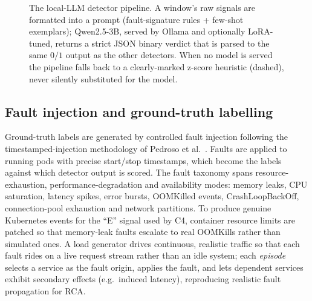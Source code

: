 \documentclass[pdflatex,sn-mathphys-num]{sn-jnl}%
\theoremstyle{thmstyleone}%
\theoremstyle{thmstyletwo}%
\theoremstyle{thmstylethree}%
\begin{document}
\begin{figure}[t]
\centering
{}
\caption{The local-LLM detector pipeline. A window's raw signals are formatted into a
prompt (fault-signature rules {+} few-shot exemplars); Qwen2.5-3B, served by Ollama and
optionally LoRA-tuned, returns a strict JSON binary verdict that is parsed to the same
$0/1$ output as the other detectors. When no model is served the pipeline falls back to
a clearly-marked z-score heuristic (dashed), never silently substituted for the model.}\label{fig:llm}
\end{figure}

\subsection{Fault injection and ground-truth labelling}\label{sec:method-faults}

Ground-truth labels are generated by controlled fault injection following the timestamped-injection methodology of Pedroso et al.\ \cite{pedroso2025}. Faults are applied to running pods with precise start/stop timestamps, which become the labels against which detector output is scored. The fault taxonomy spans resource-exhaustion, performance-degradation and availability modes: memory leaks, CPU saturation, latency spikes, error bursts, OOMKilled events, CrashLoopBackOff, connection-pool exhaustion and network partitions. To produce genuine Kubernetes events for the ``E'' signal used by C4, container resource limits are patched so that memory-leak faults escalate to real OOMKills rather than simulated ones. A load generator drives continuous, realistic traffic so that each fault rides on a live request stream rather than an idle system; each \emph{episode} selects a service as the fault origin, applies the fault, and lets dependent services exhibit secondary effects (e.g.\ induced latency), reproducing realistic fault propagation for RCA.
\end{document}
